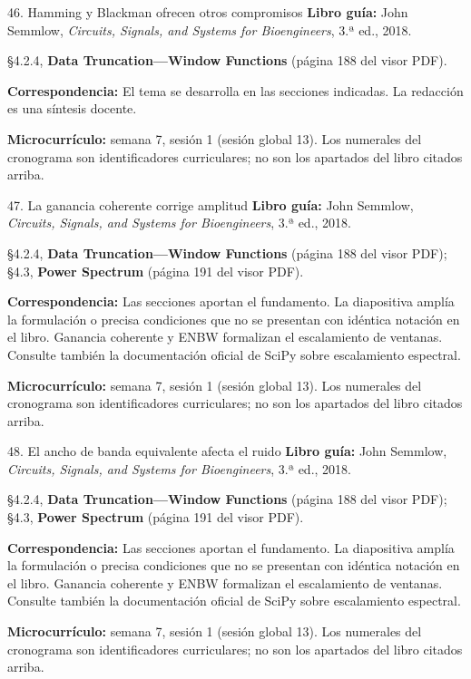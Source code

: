 \documentclass[
  10pt,
  ignorenonframetext,
  aspectratio=169,
  spanish,
]{beamer}
\begin{document}
\begin{frame}{46. Hamming y Blackman ofrecen otros compromisos}
\label{hamming-y-blackman-ofrecen-otros-compromisos}
\textbf{Libro guía:} John Semmlow, \emph{Circuits, Signals, and Systems
for Bioengineers}, 3.ª ed., 2018.

§4.2.4, \textbf{Data Truncation---Window Functions} (página 188 del
visor PDF).

\textbf{Correspondencia:} El tema se desarrolla en las secciones
indicadas. La redacción es una síntesis docente.

\textbf{Microcurrículo:} semana 7, sesión 1 (sesión global 13). Los
numerales del cronograma son identificadores curriculares; no son los
apartados del libro citados arriba.
\end{frame}

\begin{frame}{47. La ganancia coherente corrige amplitud}
\label{la-ganancia-coherente-corrige-amplitud}
\textbf{Libro guía:} John Semmlow, \emph{Circuits, Signals, and Systems
for Bioengineers}, 3.ª ed., 2018.

§4.2.4, \textbf{Data Truncation---Window Functions} (página 188 del
visor PDF); §4.3, \textbf{Power Spectrum} (página 191 del visor PDF).

\textbf{Correspondencia:} Las secciones aportan el fundamento. La
diapositiva amplía la formulación o precisa condiciones que no se
presentan con idéntica notación en el libro. Ganancia coherente y ENBW
formalizan el escalamiento de ventanas. Consulte también la
documentación oficial de SciPy sobre escalamiento espectral.

\textbf{Microcurrículo:} semana 7, sesión 1 (sesión global 13). Los
numerales del cronograma son identificadores curriculares; no son los
apartados del libro citados arriba.
\end{frame}

\begin{frame}{48. El ancho de banda equivalente afecta el ruido}
\label{el-ancho-de-banda-equivalente-afecta-el-ruido}
\textbf{Libro guía:} John Semmlow, \emph{Circuits, Signals, and Systems
for Bioengineers}, 3.ª ed., 2018.

§4.2.4, \textbf{Data Truncation---Window Functions} (página 188 del
visor PDF); §4.3, \textbf{Power Spectrum} (página 191 del visor PDF).

\textbf{Correspondencia:} Las secciones aportan el fundamento. La
diapositiva amplía la formulación o precisa condiciones que no se
presentan con idéntica notación en el libro. Ganancia coherente y ENBW
formalizan el escalamiento de ventanas. Consulte también la
documentación oficial de SciPy sobre escalamiento espectral.

\textbf{Microcurrículo:} semana 7, sesión 1 (sesión global 13). Los
numerales del cronograma son identificadores curriculares; no son los
apartados del libro citados arriba.
\end{frame}
\end{document}
